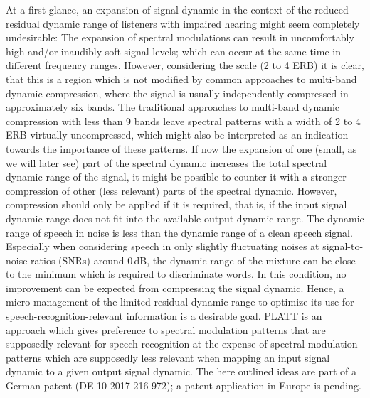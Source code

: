 \documentclass[10pt,a4paper,twocolumn]{article}
\begin{document}
At a first glance, an expansion of signal dynamic in the context of the reduced residual dynamic range of listeners with impaired hearing might seem completely undesirable:
%
The expansion of spectral modulations can result in uncomfortably high and/or inaudibly soft signal levels; which can occur at the same time in different frequency ranges.
%
However, considering the scale (2 to 4 ERB) it is clear, that this is a region which is not modified by common approaches to multi-band dynamic compression, where the signal is usually independently compressed in approximately six bands.
%
The traditional approaches to multi-band dynamic compression with less than 9 bands leave spectral patterns with a width of 2 to 4 ERB virtually uncompressed, which might also be interpreted as an indication towards the importance of these patterns. 
%
If now the expansion of one (small, as we will later see) part of the spectral dynamic increases the total spectral dynamic range of the signal, it might be possible to counter it with a stronger compression of other (less relevant) parts of the spectral dynamic.
%
However, compression should only be applied if it is required, that is, if the input signal dynamic range does not fit into the available output dynamic range.
%
The dynamic range of speech in noise is less than the dynamic range of a clean speech signal.
%
Especially when considering speech in only slightly fluctuating noises at signal-to-noise ratios (SNRs) around 0\,dB, the dynamic range of the mixture can be close to the minimum which is required to discriminate words.
%
In this condition, no improvement can be expected from compressing the signal dynamic.
%
Hence, a micro-management of the limited residual dynamic range to optimize its use for speech-recognition-relevant information is a desirable goal.
%
PLATT is an approach which gives preference to spectral modulation patterns that are supposedly relevant for speech recognition at the expense of spectral modulation patterns which are supposedly less relevant when mapping an input signal dynamic to a given output signal dynamic.
%
The here outlined ideas are part of a German patent (DE 10 2017 216 972); a patent application in Europe is pending.
\end{document}
